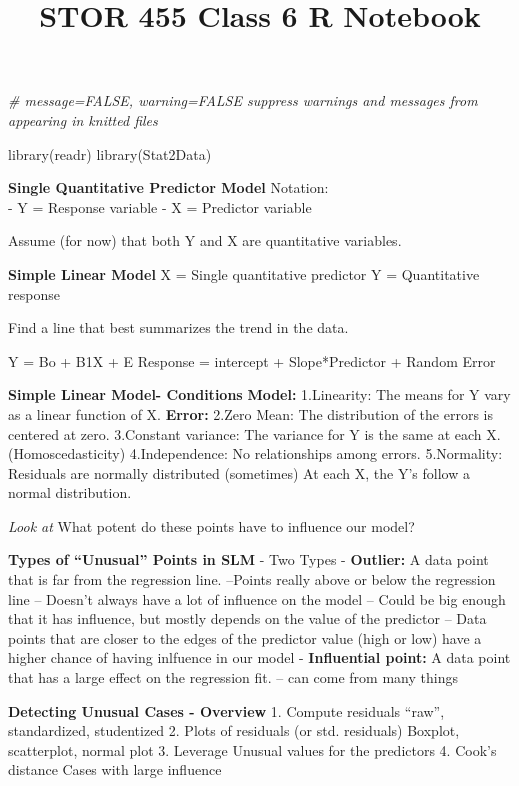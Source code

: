 \documentclass[
]{article}
\title{STOR 455 Class 6 R Notebook}
\author{}
\date{\vspace{-2.5em}}
\newenvironment{Shaded}{\begin{snugshade}}{\end{snugshade}}
\newcommand{\CommentTok}[1]{\textcolor[rgb]{0.56,0.35,0.01}{\textit{#1}}}
\newcommand{\FunctionTok}[1]{\textcolor[rgb]{0.00,0.00,0.00}{#1}}
\newcommand{\NormalTok}[1]{#1}
\begin{document}
\maketitle

\begin{Shaded}
\begin{Highlighting}[]
\CommentTok{\# message=FALSE, warning=FALSE suppress warnings and messages from appearing in knitted files}

\FunctionTok{library}\NormalTok{(readr)}
\FunctionTok{library}\NormalTok{(Stat2Data)}
\end{Highlighting}
\end{Shaded}

\textbf{Single Quantitative Predictor Model} Notation:\\
- Y = Response variable - X = Predictor variable

Assume (for now) that both Y and X are quantitative variables.

\textbf{Simple Linear Model} X = Single quantitative predictor Y =
Quantitative response

Find a line that best summarizes the trend in the data.

Y = Bo + B1X + E Response = intercept + Slope*Predictor + Random Error

\textbf{Simple Linear Model- Conditions} \textbf{Model:} 1.Linearity:
The means for Y vary as a linear function of X. \textbf{Error:} 2.Zero
Mean: The distribution of the errors is centered at zero. 3.Constant
variance: The variance for Y is the same at each X. (Homoscedasticity)
4.Independence: No relationships among errors. 5.Normality: Residuals
are normally distributed (sometimes) At each X, the Y's follow a normal
distribution.

\emph{Look at} What potent do these points have to influence our model?

\textbf{Types of ``Unusual'' Points in SLM} - Two Types -
\textbf{Outlier:} A data point that is far from the regression line.
--Points really above or below the regression line -- Doesn't always
have a lot of influence on the model -- Could be big enough that it has
influence, but mostly depends on the value of the predictor -- Data
points that are closer to the edges of the predictor value (high or low)
have a higher chance of having inlfuence in our model -
\textbf{Influential point:} A data point that has a large effect on the
regression fit. -- can come from many things

\textbf{Detecting Unusual Cases - Overview} 1. Compute residuals
``raw'', standardized, studentized 2. Plots of residuals (or std.
residuals) Boxplot, scatterplot, normal plot 3. Leverage Unusual values
for the predictors 4. Cook's distance Cases with large influence
\end{document}
